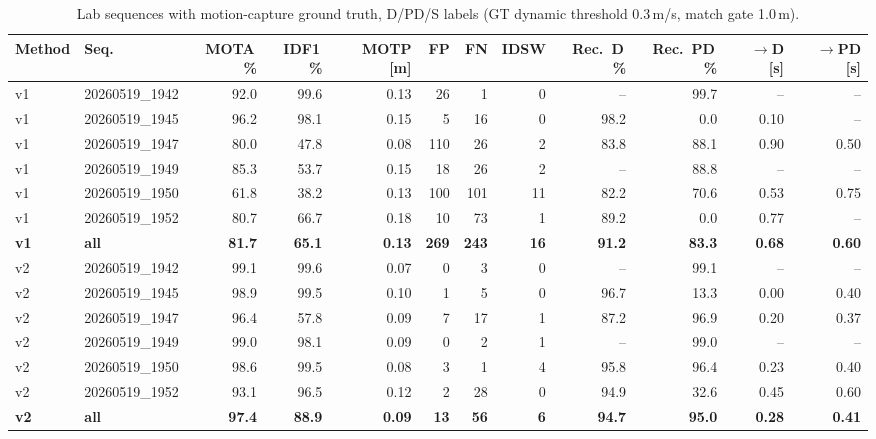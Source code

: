 \begin{table}[t]
\centering
\caption{Lab sequences with motion-capture ground truth, D/PD/S labels (GT dynamic threshold 0.3\,m/s, match gate 1.0\,m).}
\label{tab:own_r7_full}
\setlength{\tabcolsep}{3pt}
\begin{tabular}{llrrrrrrrrrr}
\toprule
Method & Seq. & MOTA\,\% & IDF1\,\% & MOTP [m] & FP & FN & IDSW & Rec.\ D\,\% & Rec.\ PD\,\% & $\to$D [s] & $\to$PD [s] \\
\midrule
v1 & 20260519\_1942 & 92.0 & 99.6 & 0.13 & 26 & 1 & 0 & -- & 99.7 & -- & -- \\
v1 & 20260519\_1945 & 96.2 & 98.1 & 0.15 & 5 & 16 & 0 & 98.2 & 0.0 & 0.10 & -- \\
v1 & 20260519\_1947 & 80.0 & 47.8 & 0.08 & 110 & 26 & 2 & 83.8 & 88.1 & 0.90 & 0.50 \\
v1 & 20260519\_1949 & 85.3 & 53.7 & 0.15 & 18 & 26 & 2 & -- & 88.8 & -- & -- \\
v1 & 20260519\_1950 & 61.8 & 38.2 & 0.13 & 100 & 101 & 11 & 82.2 & 70.6 & 0.53 & 0.75 \\
v1 & 20260519\_1952 & 80.7 & 66.7 & 0.18 & 10 & 73 & 1 & 89.2 & 0.0 & 0.77 & -- \\
\textbf{v1} & \textbf{all} & \textbf{81.7} & \textbf{65.1} & \textbf{0.13} & \textbf{269} & \textbf{243} & \textbf{16} & \textbf{91.2} & \textbf{83.3} & \textbf{0.68} & \textbf{0.60} \\
\midrule
v2 & 20260519\_1942 & 99.1 & 99.6 & 0.07 & 0 & 3 & 0 & -- & 99.1 & -- & -- \\
v2 & 20260519\_1945 & 98.9 & 99.5 & 0.10 & 1 & 5 & 0 & 96.7 & 13.3 & 0.00 & 0.40 \\
v2 & 20260519\_1947 & 96.4 & 57.8 & 0.09 & 7 & 17 & 1 & 87.2 & 96.9 & 0.20 & 0.37 \\
v2 & 20260519\_1949 & 99.0 & 98.1 & 0.09 & 0 & 2 & 1 & -- & 99.0 & -- & -- \\
v2 & 20260519\_1950 & 98.6 & 99.5 & 0.08 & 3 & 1 & 4 & 95.8 & 96.4 & 0.23 & 0.40 \\
v2 & 20260519\_1952 & 93.1 & 96.5 & 0.12 & 2 & 28 & 0 & 94.9 & 32.6 & 0.45 & 0.60 \\
\textbf{v2} & \textbf{all} & \textbf{97.4} & \textbf{88.9} & \textbf{0.09} & \textbf{13} & \textbf{56} & \textbf{6} & \textbf{94.7} & \textbf{95.0} & \textbf{0.28} & \textbf{0.41} \\
\bottomrule
\end{tabular}
\end{table}
